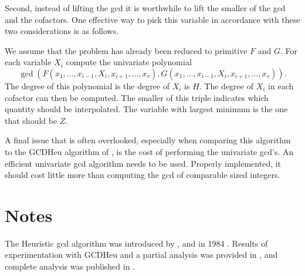 Second, instead of lifting the {\sc gcd} it is worthwhile to lift the
smaller of the {\sc gcd} and the cofactors.  One effective way to pick
this variable in accordance with these two considerations is as
follows.

We assume that the problem has already been reduced to primitive $F$
and $G$.  For each variable $X_i$ compute the univariate polynomial
\[
\gcd(F(x_1, \ldots, x_{i-1}, X_i, x_{i+1}, \ldots, x_v), 
     G(x_1, \ldots, x_{i-1}, X_i, x_{i+1}, \ldots, x_v)).
\]
The degree of this polynomial is the degree of $X_i$ is $H$.  The
degree of $X_i$ in each cofactor can then be computed.  The smaller of
this triple indicates which quantity should be interpolated.  The
variable with largest minimum is the one that should be $Z$.

A final issue that is often overlooked, especially when comparing
this algorithm to the GCDHeu algorithm of
, is the cost of performing the univariate
{\sc gcd}'s.  An efficient univariate {\sc gcd} algorithm needs to be
used.  Properly implemented, it should cost little more than computing
the {\sc gcd} of comparable sized integers.

\section*{Notes}

\small

 The Heuristic {\sc gcd} algorithm was
introduced by {\CharBW}, {\Geddes} and {\Gonnet} in 1984 \cite{Char84}.
Results of experimentation with GCDHeu and a partial analysis was
provided in \cite{Davenport85a}, and complete analysis was published
in \cite{Char89}.

\normalsize

